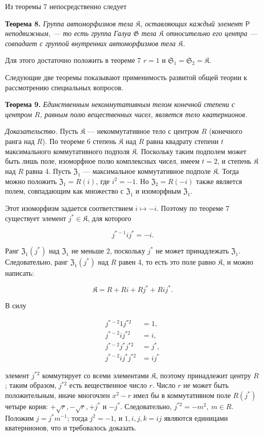 \documentclass[11pt]{article}
\begin{document}
Из теоремы 7 непосредственно следует

\textbf{Теорема 8.} \emph{Группа автоморфизмов тела \(\mathfrak K\), оставляющих каждый элемент \(\mathsf P\) неподвижным, --- то есть группа Галуа \(\mathfrak G\) тела \(\mathfrak K\) относительно его центра --- совпадает с группой внутренних автоморфизмов тела \(\mathfrak K\).}

Для этого достаточно положить в теореме 7 \(r=1\) и \(\mathfrak S_1=\mathfrak S_2=\mathfrak K\).

Следующие две теоремы показывают применимость развитой общей теории к рассмотрению специальных вопросов.

\textbf{Теорема 9.} \emph{Единственным некоммутативным телом конечной степени с центром \(R\), равным полю вещественных чисел, является тело кватернионов.}

\emph{Доказательство.} Пусть \(\mathfrak K\) --- некоммутативное тело с центром \(R\) (конечного ранга над \(R\)). По теореме 6 степень \(\mathfrak K\) над \(R\) равна квадрату степени \(t\) максимального коммутативного подполя \(\mathfrak K\). Поскольку таким подполем может быть лишь поле, изоморфное полю комплексных чисел, имеем \(t=2\), и степень \(\mathfrak K\) над \(R\) равна 4. Пусть \(\mathfrak Z_1\) --- максимальное коммутативное подполе \(\mathfrak K\). Тогда можно положить \(\mathfrak Z_1=R(i)\), где \(i^2=-1\). Но \(\mathfrak Z_2=R(-i)\) также является полем, совпадающим как множество с \(\mathfrak Z_1\) и изоморфным \(\mathfrak Z_1\).

Этот изоморфизм задается соответствием \(i\mapsto -i\). Поэтому по теореме 7 существует элемент \(j^*\in\mathfrak K\), для которого

\[
j^{*-1}ij^*=-i.
\]

Ранг \(\mathfrak Z_1(j^*)\) над \(\mathfrak Z_1\) не меньше 2, поскольку \(j^*\) не может принадлежать \(\mathfrak Z_1\). Следовательно, ранг \(\mathfrak Z_1(j^*)\) над \(R\) равен 4, то есть это поле равно \(\mathfrak K\), и можно написать:

\[
\mathfrak K=R+Ri+Rj^*+Rij^*.
\]

В силу

\[
\begin{aligned}
j^{*-2}1j^{*2}&=1,\\
j^{*-2}ij^{*2}&=i,\\
j^{*-2}j^*j^{*2}&=j^*,\\
j^{*-2}ij^*j^{*2}&=ij^*
\end{aligned}
\]

элемент \(j^{*2}\) коммутирует со всеми элементами \(\mathfrak K\), поэтому принадлежит центру \(R\); таким образом, \(j^{*2}\) есть вещественное число \(r\). Число \(r\) не может быть положительным, иначе многочлен \(x^2-r\) имел бы в коммутативном поле \(R(j^*)\) четыре корня: \(+\sqrt r,-\sqrt r,+j^*\) и \(-j^*\). Следовательно, \(j^{*2}=-m^2,\ m\in R\). Положим \(j=j^*m^{-1}\); тогда \(j^2=-1\), и \(1,i,j,k=ij\) являются единицами кватернионов, что и требовалось доказать.
\end{document}

